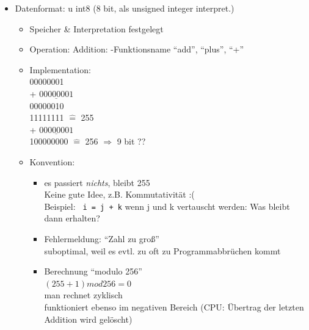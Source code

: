 \documentclass[11pt, fleqn]{scrreprt}
\begin{document}
\begin{itemize}[label={$\bullet$}]
	\item Datenformat: u int8 (8 bit, als unsigned integer interpret.)
	\begin{itemize}[label={-}]
		\item Speicher \& Interpretation festgelegt
		\item Operation: Addition: -Funktionsname ``add'', ``plus'', ``+''
		\item Implementation:  \\
		\hspace*{0.5cm}00000001 \\
		\hspace*{0.05cm} + $\underline{ 00000001}$ \\
		\hspace*{0.5cm}00000010\\
		
		\hspace*{0.5cm}11111111 $\widehat{=}$ 255 \\
		\hspace*{0.05cm} + $\underline{00000001}$ \\
		\hspace*{0.25cm} 100000000 $\widehat{=}$ 256 $\Rightarrow$ 9 bit ?? \\
		
		\item Konvention:
		\begin{itemize}[label={-}]
			\item es passiert \emph{nichts}, bleibt 255 \\
			Keine gute Idee, z.B. Kommutativität :( \\
			Beispiel: \verb| i = j + k| wenn j und k vertauscht werden: Was bleibt dann erhalten?
			\item Fehlermeldung: ``Zahl zu groß'' \\
			suboptimal, weil es evtl. zu oft zu Programmabbrüchen kommt
			\item Berechnung ``modulo 256'' \\
			$(255+1)mod256 = 0$ \\
			man rechnet zyklisch \\
			funktioniert ebenso im negativen Bereich
			(CPU: Übertrag der letzten Addition wird gelöscht)
		\end{itemize}
	\end{itemize}
\end{itemize}
\end{document}
